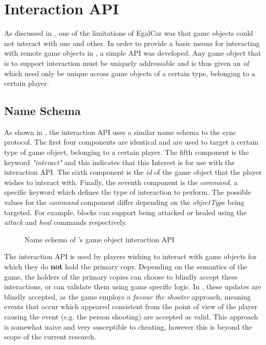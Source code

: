 \section{\game{} Interaction API}\label{sec:des:interaction}
As discussed in , one of the limitations of EgalCar was that game objects could not interact with one and other. In order to provide a basic means for interacting with remote game objects in \game{}, a simple API was developed. Any game object that is to support interaction must be uniquely addressable and is thus given an \textit{id} which need only be unique across game objects of a certain type, belonging to a certain player.


\subsection{Name Schema}
As shown in , the interaction API uses a similar name schema to the sync protocol. The first four components are identical and are used to target a certain type of game object, belonging to a certain player. The fifth component is the keyword \textit{"interact"} and this indicates that this Interest is for use with the interaction API. The sixth component is the \textit{id} of the game object that the player wishes to interact with. Finally, the seventh component is the \textit{command}, a specific keyword which defines the type of interaction to perform. The possible values for the \textit{command} component differ depending on the \textit{objectType} being targeted. For example, blocks can support being attacked or healed using the \textit{attack} and \textit{heal} commands respectively.

\begin{figure}[H]
    \centering
    \caption{Name schema of \game{}'s game object interaction API}
    \label{fig:des:interaction-api-name}
\end{figure}

The interaction API is used by players wishing to interact with game objects for which they do \textbf{not} hold the primary copy. Depending on the semantics of the game, the holders of the primary copies can choose to blindly accept these interactions, or can validate them using game specific logic. In \game{}, these updates are blindly accepted, as the game employs a \textit{favour the shooter} approach, meaning events that occur which appeared consistent from the point of view of the player causing the event (e.g. the person shooting) are accepted as valid. This approach is somewhat naive and very susceptible to cheating, however this is beyond the scope of the current research. 

